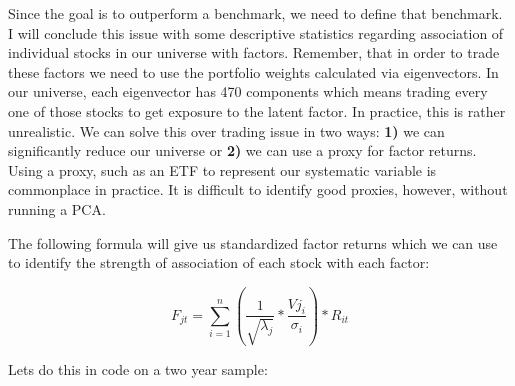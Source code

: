 \documentclass[11pt]{article}
\begin{document}
    Since the goal is to outperform a benchmark, we need to define that
benchmark. I will conclude this issue with some descriptive statistics
regarding association of individual stocks in our universe with factors.
Remember, that in order to trade these factors we need to use the
portfolio weights calculated via eigenvectors. In our universe, each
eigenvector has 470 components which means trading every one of those
stocks to get exposure to the latent factor. In practice, this is rather
unrealistic. We can solve this over trading issue in two ways:
\textbf{1)} we can significantly reduce our universe or \textbf{2)} we
can use a proxy for factor returns. Using a proxy, such as an ETF to
represent our systematic variable is commonplace in practice. It is
difficult to identify good proxies, however, without running a PCA.

The following formula will give us standardized factor returns which we
can use to identify the strength of association of each stock with each
factor:

\[ F_{jt} = \sum_{i=1}^n (\frac{1}{\sqrt{\lambda_{j}}} * \frac{Vj_{i}}{\sigma_{i}})*R_{it}\]

Lets do this in code on a two year sample:
\end{document}
